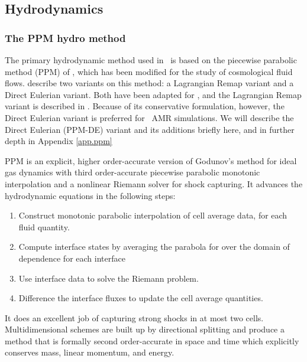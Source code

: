 \subsection{Hydrodynamics}\label{sec.ov.hydro}

\subsubsection{The PPM hydro method}\label{sec.ov.hydro.ppm}


The primary hydrodynamic method used in \enzo\ is based on the
piecewise parabolic method (PPM) of
\citet{1984JCoPh..54..174C}, which has been
modified for the study of cosmological fluid flows.  
\citet{1984JCoPh..54..174C} describe two variants on this method: a
Lagrangian Remap variant and a Direct Eulerian variant.  Both have
been adapted for \enzo, and the Lagrangian Remap 
variant is described in \citet{1995CoPhC..89..149B}.  Because of its
conservative formulation, however, the Direct Eulerian variant is
preferred for \enzo\ AMR simulations.  We will describe the Direct
Eulerian (PPM-DE) variant and its additions briefly here, and in
further depth in Appendix \ref{app.ppm} 


PPM is an explicit, higher order-accurate version of
Godunov's method for ideal gas dynamics with third order-accurate piecewise parabolic
monotonic interpolation and a nonlinear Riemann solver for shock
capturing.  It advances the hydrodynamic equations in the following
steps:
\begin{enumerate}
 \item Construct monotonic parabolic interpolation of cell average
 data, for each fluid quantity.
 \item Compute interface states by averaging the parabola for over the domain of dependence for
 each interface
 \item Use interface data to solve the Riemann problem.
 \item Difference the interface fluxes to update the cell average quantities.
\end{enumerate}
It does an excellent job of capturing strong shocks in at
most two cells.  Multidimensional schemes are built up by directional
splitting and produce a method that is formally second order-accurate
in space and time which explicitly conserves mass, linear momentum, and energy.  

